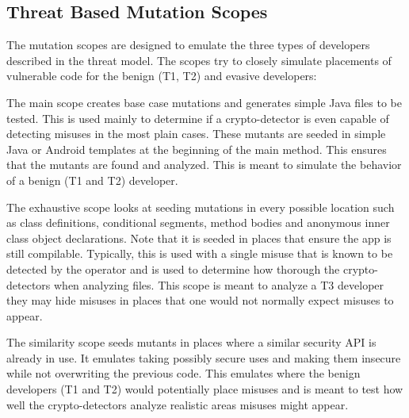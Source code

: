 \subsection{Threat Based Mutation Scopes}
\label{ch2:sec:scopes}

The mutation scopes are designed to emulate the three types of developers described in the threat model. The scopes try to closely simulate placements of vulnerable code for the benign (T1, T2) and evasive developers:

The main scope creates base case mutations and generates simple Java files to be tested. This is used mainly to determine if a crypto-detector is even capable of detecting misuses in the most plain cases. These mutants are seeded in simple Java or Android templates at the beginning of the main method. This ensures that the mutants are found and analyzed. This is meant to simulate the behavior of a benign (T1 and T2) developer.

The exhaustive scope looks at seeding mutations in every possible location such as class definitions, conditional segments, method bodies and anonymous inner class object declarations. Note that it is seeded in places that ensure the app is still compilable. Typically, this is used with a single misuse that is known to be detected by the operator and is used to determine how thorough the crypto-detectors when analyzing files. This scope is meant to analyze a T3 developer they may hide misuses in places that one would not normally expect misuses to appear.

The similarity scope seeds mutants in places where a similar security API is already in use. It emulates taking possibly secure uses and making them insecure while not overwriting the previous code. This emulates where the benign developers (T1 and T2) would potentially place misuses and is meant to test how well the crypto-detectors analyze realistic areas misuses might appear. 
